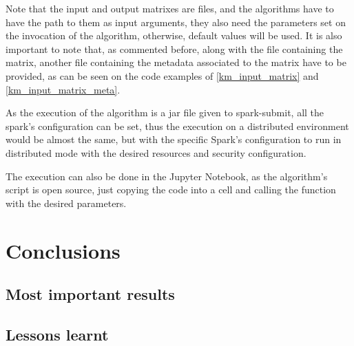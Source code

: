 \documentclass[11pt]{book} %
\begin{document}
    Note that the input and output matrixes are files, and the algorithms have to have the path to them as input arguments, they also need the parameters set on the invocation of the algorithm, otherwise, default values will be used. It is also important to note that, as commented before, along with the file containing the matrix, another file containing the metadata associated to the matrix have to be provided, as can be seen on the code examples of \ref{km_input_matrix} and \ref{km_input_matrix_meta}.

    As the execution of the algorithm is a jar file given to spark-submit, all the spark's configuration can be set, thus the execution on a distributed environment would be almost the same, but with the specific Spark's configuration to run in distributed mode with the desired resources and security configuration.

    The execution can also be done in the Jupyter Notebook, as the algorithm's script is open source, just copying the code into a cell and calling the function with the desired parameters.


\chapter{Conclusions}
  \label{sec:conclusions}

  \section{Most important results}

  \section{Lessons learnt}

\newpage


\nocite{*}
\newpage
\printbibliography
\end{document}
